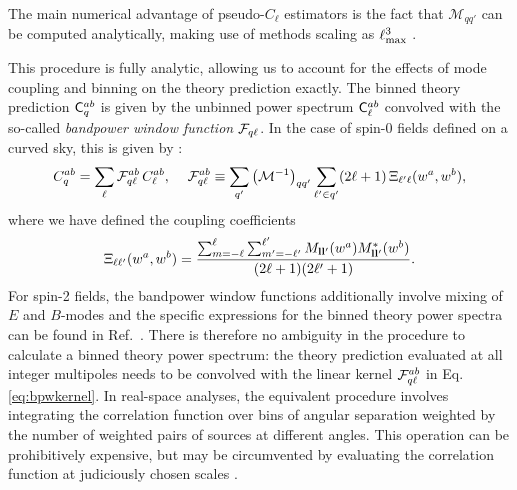 \documentclass[a4paper,11pt]{article}
\begin{document}
\begin{enumerate}
        The main numerical advantage of pseudo-$C_\ell$ estimators is the fact that $\mathcal{M}_{qq'}$ can be computed analytically, making use of methods scaling as $\ell_{\rm max}^3$ \citep{astro-ph/0105302}.
      \end{enumerate}
      This procedure is fully analytic, allowing us to account for the effects of mode coupling and binning on the theory prediction exactly. The binned theory prediction ${\sf C}^{ab}_q$ is given by the unbinned power spectrum ${\sf C}^{ab}_\ell$ convolved with the so-called {\sl bandpower window function} ${\cal F}_{q\ell}$. In the case of spin-0 fields defined on a curved sky, this is given by \citep{1809.09603}:
      \begin{equation}\label{eq:bpwkernel}
        C^{ab}_q = \sum_\ell {\cal F}^{ab}_{q\ell}\,C^{ab}_\ell,\hspace{12pt}
        {\cal F}^{ab}_{q\ell}\equiv\sum_{q'}\left(\mathcal{M}^{-1}\right)_{qq'}\sum_{\ell'\in q'}(2\ell+1)\,\Xi_{\ell'\ell}(w^a,w^b),
      \end{equation}
      where we have defined the coupling coefficients
      \begin{equation}\label{eq:coupXi}
        \Xi_{\ell\ell'}(w^a,w^b)=\frac{\sum_{m=-\ell}^\ell\sum_{m'=-\ell'}^{\ell'}M_{{\bf l}{\bf l}'}(w^a)M^*_{{\bf l}{\bf l}'}(w^b)}{(2\ell+1)(2\ell'+1)}.
      \end{equation}
      For spin-2 fields, the bandpower window functions additionally involve mixing of $E$ and $B$-modes and the specific expressions for the binned theory power spectra can be found in Ref.~\cite{1809.09603}. There is therefore no ambiguity in the procedure to calculate a binned theory power spectrum: the theory prediction evaluated at all integer multipoles needs to be convolved with the linear kernel ${\cal F}^{ab}_{q\ell}$ in Eq. \ref{eq:bpwkernel}. In real-space analyses, the equivalent procedure involves integrating the correlation function over bins of angular separation weighted by the number of weighted pairs of sources at different angles. This operation can be prohibitively expensive, but may be circumvented by evaluating the correlation function at judiciously chosen scales \citep{1804.10663,1810.02353}.
      
\end{document}
